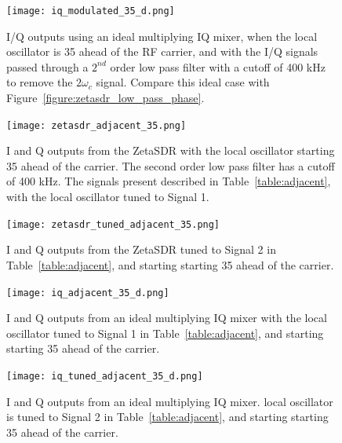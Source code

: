 \documentclass[11pt, twoside]{article}
\begin{document}
\begin{figure}
  \center
    \captionsetup{width=.8\linewidth}
  \texttt{[image: iq\_modulated\_35\_d.png]}
  \caption{I/Q outputs using an ideal multiplying IQ mixer, when the
    local oscillator is 35{\degree} ahead of the RF carrier, and with
    the I/Q signals passed through a $2^{nd}$ order low pass filter
    with a cutoff of 400 kHz to remove the $2{\omega_c}$ signal.
    Compare this ideal case with
    Figure~\ref{figure:zetasdr_low_pass_phase}.}
  \label{figure:iq_mod_low_pass_phase}
\end{figure}

\begin{figure}
  \center
  \captionsetup{width=.8\linewidth}
  \texttt{[image: zetasdr\_adjacent\_35.png]}
  \caption{I and Q outputs from the ZetaSDR with the local oscillator
    starting 35{\degree} ahead of the carrier.  The second order low
    pass filter has a cutoff of 400 kHz. The signals present described
    in Table~\ref{table:adjacent}, with the local oscillator tuned to
    Signal 1.}
  \label{figure:adjacent}
\end{figure}

\begin{figure}
  \center \captionsetup{width=.8\linewidth}
  \texttt{[image: zetasdr\_tuned\_adjacent\_35.png]}
  \caption{I and Q outputs from the ZetaSDR tuned to Signal 2 in
    Table~\ref{table:adjacent}, and starting starting 35{\degree}
    ahead of the carrier.}
  \label{figure:tuned_adjacent}
\end{figure}

\begin{figure}
  \center
  \captionsetup{width=.8\linewidth}
  \texttt{[image: iq\_adjacent\_35\_d.png]}
  \caption{I and Q outputs from an ideal multiplying IQ mixer with the
    local oscillator tuned to Signal 1 in Table~\ref{table:adjacent},
    and starting starting 35{\degree} ahead of the carrier.}
  \label{figure:iq_adjacent}
\end{figure}


\begin{figure}
  \center
  \captionsetup{width=.8\linewidth}
  \texttt{[image: iq\_tuned\_adjacent\_35\_d.png]}
  \caption{I and Q outputs from an ideal multiplying IQ mixer.  local
    oscillator is tuned to Signal 2 in Table~\ref{table:adjacent}, and
    starting starting 35{\degree} ahead of the
    carrier.}
  \label{figure:iq_tuned_adjacent}
\end{figure}
\end{document}
